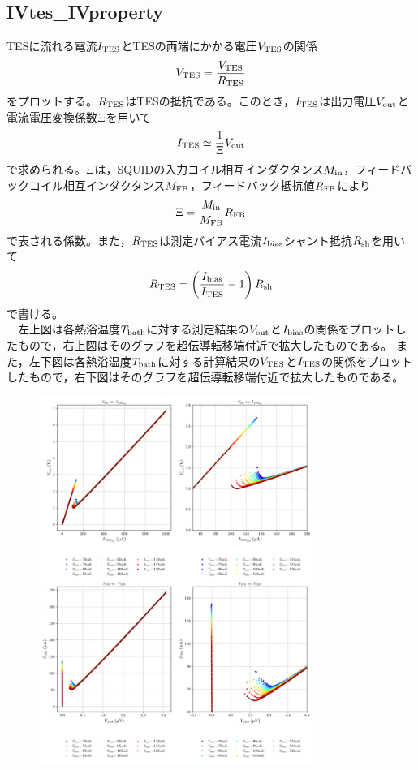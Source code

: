 \documentclass[platex,dvipdfmx,10pt,twoside,a4paper,jis2004]{jsarticle}
\begin{document}
\subsection*{IVtes\_IVproperty}
TESに流れる電流$I_{\rm TES}$とTESの両端にかかる電圧$V_{\rm TES}$の関係
\[
V_{\rm TES} = \frac{V_{\rm TES}}{R_{\rm TES}}
\]
をプロットする。$R_{\rm TES}$はTESの抵抗である。このとき，$I_{\rm TES}$は出力電圧$V_{\rm out}$と電流電圧変換係数$\Xi$を用いて
\[
I_{\rm TES} \simeq \frac{1}{\Xi}V_{\rm out}
\]
で求められる。$\Xi$は，SQUIDの入力コイル相互インダクタンス$M_{\rm in}$，フィードバックコイル相互インダクタンス$M_{\rm FB}$，フィードバック抵抗値$R_{\rm FB}$により
\[
\Xi = \frac{M_{\rm in}}{M_{\rm FB}}R_{\rm FB}
\]
で表される係数。また，$R_{\rm TES}$は測定バイアス電流$I_{\rm bias}$シャント抵抗$R_{\rm sh}$を用いて
\[
R_{\rm TES} = \left(\frac{I_{\rm bias}}{I_{\rm TES}}-1\right)R_{\rm sh}
\]
で書ける。\\　左上図は各熱浴温度$T_{\rm bath}$に対する測定結果の$V_{\rm out}$と$I_{\rm bias}$の関係をプロットしたもので，右上図はそのグラフを超伝導転移端付近で拡大したものである。
また，左下図は各熱浴温度$T_{\rm bath}$に対する計算結果の$V_{\rm TES}$と$I_{\rm TES}$の関係をプロットしたもので，右下図はそのグラフを超伝導転移端付近で拡大したものである。
\begin{figure}[H]
    \centering
    \includegraphics[width=0.8\textwidth]{IVtes_IVproperty.png}
    \label{fig:IVtesIVproperty}
\end{figure}
\clearpage
\end{document}
